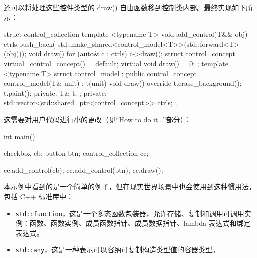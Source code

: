 还可以将处理这些控件类型的 draw() 自由函数移到控制类内部。最终实现如下所示：

\begin{cpp}
struct control_collection
{
    template <typename T>
    void add_control(T&& obj)
    {
        ctrls.push_back(
        std::make_shared<control_model<T>>(std::forward<T>(obj)));
    }
    void draw()
    {
        for (auto& c : ctrls)
        {
            c->draw();
        }
    }
    struct control_concept
    {
        virtual ~control_concept() = default;
        virtual void draw() = 0;
    };
    template <typename T>
    struct control_model : public control_concept
    {
        control_model(T& unit) : t(unit) {}
        void draw() override
        {
            t.erase_background();
            t.paint();
        }
        private:
        T& t;
    };
private:
    std::vector<std::shared_ptr<control_concept>> ctrls;
};
\end{cpp}

这需要对用户代码进行小的更改（见“How to do it...”部分）：

\begin{cpp}
int main()
{
    checkbox cb;
    button btn;
    control_collection cc;

    cc.add_control(cb);
    cc.add_control(btn);
    cc.draw();
}
\end{cpp}

本示例中看到的是一个简单的例子，但在现实世界场景中也会使用到这种惯用法，包括 C++ 标准库中：

\begin{itemize}
\item
\verb|std::function|，这是一个多态函数包装器，允许存储、复制和调用可调用实例：函数、函数实例、成员函数指针、成员数据指针、lambda 表达式和绑定表达式。

\item
\verb|std::any|，这是一种表示可以容纳可复制构造类型值的容器类型。
\end{itemize}


